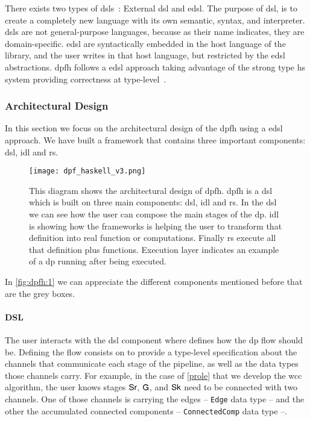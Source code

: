 There exists two types of \acrlong{dsl}s~\cite{dsl}: External \acrfull{dsl} and \acrfull{edsl}. The purpose of \acrshort{dsl}, is to create a completely new language with its own semantic, syntax, and interpreter. 
\acrshort{dsl}s are not general-purpose languages, because as their name indicates, they are domain-specific. \acrshort{edsl} are syntactically embedded in the host language of the library, and the user writes in that host language, but restricted by the \acrshort{edsl} abstractions.
\acrshort{dpfh} follows a \acrshort{edsl} approach taking advantage of the strong type \acrshort{hs} system providing correctness at type-level~\cite{curryhoward}.

\subsubsection{Architectural Design}
In this section we focus on the architectural design of the \acrshort{dpfh} using a \acrshort{edsl} approach. We have built a framework that contains
three important components: \acrshort{dsl}, \acrshort{idl} and \acrshort{rs}. 

\begin{figure}[!ht]
  \centering
   \texttt{[image: dpf\_haskell\_v3.png]}
    \caption[{[\acrshort{dpfh}] Architectural design of \acrshort{dpfh}}]{This diagram shows the architectural design of \acrshort{dpfh}. \acrshort{dpfh} is a \acrshort{dsl} which is built on three main components: \acrshort{dsl}, \acrshort{idl} and \acrshort{rs}. In the \acrshort{dsl} we can see how the user can compose the main stages of the \acrshort{dp}. \acrshort{idl} is showing how the frameworks is helping the user to transform that definition into real function or computations. Finally \acrshort{rs} execute all that definition plus functions. Execution layer indicates an example of a \acrshort{dp} running after being executed.}
    \label{fig:dpfh:1}
\end{figure}

In \autoref{fig:dpfh:1} we can appreciate the different components mentioned before that are the grey boxes.

\paragraph{DSL} The user interacts with the \acrshort{dsl} component where defines how the \acrshort{dp} flow
should be. Defining the flow consists on to provide a type-level specification about the channels that communicate each stage of the pipeline, as well as the data types those channels carry. 
For example, in the case of \autoref{prole} that we develop the \acrshort{wcc} algorithm, the user knows stages $\mathsf{Sr}$, $\mathsf{G}$, and $\mathsf{Sk}$ need to be connected with two channels. 
One of those channels is carrying the edges -- \texttt{Edge} data type -- and the other the accumulated connected components -- \texttt{ConnectedComp} data type --. 

